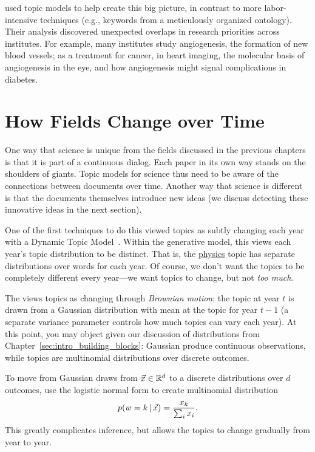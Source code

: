 \citet{talley-11} used topic models to help create this big picture,
in contrast to more labor-intensive techniques (e.g., keywords from a
meticulously organized ontology).  Their analysis discovered
unexpected overlaps in research priorities across institutes.  For
example, many institutes study angiogenesis, the formation of new
blood vessels; as a treatment for cancer, in heart imaging, the
molecular basis of angiogenesis in the eye, and how angiogenesis might
signal complications in diabetes.

\section{How Fields Change over Time}
\label{sec:sci_change}

One way that science is unique from the fields discussed in the
previous chapters is that it is part of a continuous dialog.  Each
paper in its own way stands on the shoulders of giants. Topic models
for science thus need to be aware of the connections between documents
over time.  Another way that science is different is that the
documents themselves introduce new ideas (we discuss detecting these
innovative ideas in the next section).

One of the first techniques to do this viewed topics as subtly
changing each year with a Dynamic Topic
Model~\citep[]{blei-06b}.  Within the generative model, this
views each year's topic distribution to be distinct.  That is, the
\underline{physics} topic has separate distributions over words for
each year.  Of course, we don't want the topics to be completely
different every year---we want topics to change, but not \emph{too
  much}.

The  views topics as changing through \emph{Brownian
  motion}: the topic at year $t$ is drawn from a Gaussian distribution
with mean at the topic for year $t-1$ (a separate variance parameter
controls how much topics can vary each year).  At this point, you may
object given our discussion of distributions from
Chapter~\ref{sec:intro_building_blocks}: Gaussian produce continuous
observations, while topics are multinomial distributions over discrete
outcomes.

To move from Gaussian draws from $\vec x \in \mathbb{R}^d$ to a discrete distributions
over $d$ outcomes, \citet{blei-06b} use the logistic normal form to
create multinomial distribution
\begin{equation}
p(w=k \, | \, \vec x)  = \frac{x_k}{\sum_i x_i}.
\end{equation}
This greatly complicates inference, but allows the topics to change
gradually from year to year.

